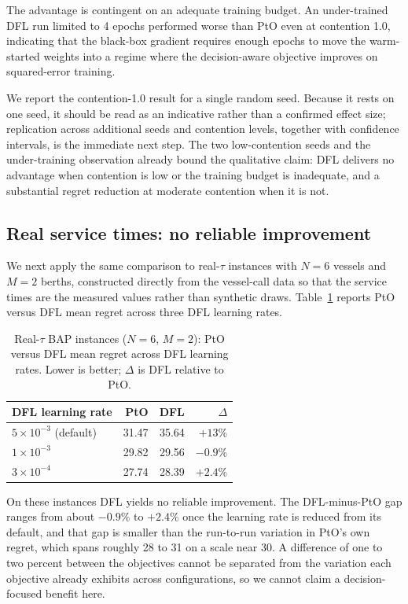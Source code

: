 The advantage is contingent on an adequate training budget. An under-trained DFL run limited to 4 epochs performed worse than PtO even at contention 1.0, indicating that the black-box gradient requires enough epochs to move the warm-started weights into a regime where the decision-aware objective improves on squared-error training.

We report the contention-1.0 result for a single random seed. Because it rests on one seed, it should be read as an indicative rather than a confirmed effect size; replication across additional seeds and contention levels, together with confidence intervals, is the immediate next step. The two low-contention seeds and the under-training observation already bound the qualitative claim: DFL delivers no advantage when contention is low or the training budget is inadequate, and a substantial regret reduction at moderate contention when it is not.

\subsection{Real service times: no reliable improvement}

We next apply the same comparison to real-$\tau$ instances with $N=6$ vessels and $M=2$ berths, constructed directly from the vessel-call data so that the service times are the measured values rather than synthetic draws. Table~\ref{tab:real} reports PtO versus DFL mean regret across three DFL learning rates.

\begin{table}[t]
\centering
\caption{Real-$\tau$ BAP instances ($N=6$, $M=2$): PtO versus DFL mean regret across DFL learning rates. Lower is better; $\Delta$ is DFL relative to PtO.}
\label{tab:real}
\begin{tabular}{lrrr}
\toprule
DFL learning rate & PtO & DFL & $\Delta$ \\
\midrule
$5\times10^{-3}$ (default) & 31.47 & 35.64 & $+13\%$ \\
$1\times10^{-3}$           & 29.82 & 29.56 & $-0.9\%$ \\
$3\times10^{-4}$           & 27.74 & 28.39 & $+2.4\%$ \\
\bottomrule
\end{tabular}
\end{table}

On these instances DFL yields no reliable improvement. The DFL-minus-PtO gap ranges from about $-0.9\%$ to $+2.4\%$ once the learning rate is reduced from its default, and that gap is smaller than the run-to-run variation in PtO's own regret, which spans roughly 28 to 31 on a scale near 30. A difference of one to two percent between the objectives cannot be separated from the variation each objective already exhibits across configurations, so we cannot claim a decision-focused benefit here.


